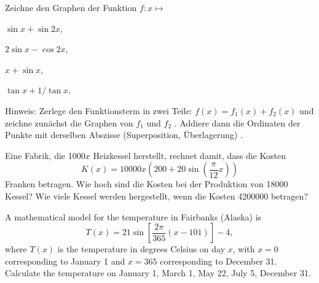 \documentclass[%
11pt,%
twoside,%
titlepage,%
german,%
headsepline%
]{scrartcl}
\begin{document}
\begin{ueb}[Superposition]
Zeichne den Graphen der Funktion $f:x\mapsto$

\begin{minipage}{0.49\textwidth}
\begin{enumeratea}
\item $\sin x + \sin2x$,
\item $2\sin x - \cos2x$,
\end{enumeratea}
\end{minipage}
\begin{minipage}{0.49\textwidth}
\begin{enumeratea}
\addtocounter{enumi}{2}
\item $x+\sin x$,
\item $\tan x +1/\tan x$.\\
\end{enumeratea}
\end{minipage}

\noindent Hinweis: Zerlege den Funktionsterm in zwei Teile: $f(x)=f_1(x)+f_2(x)$ und zeichne zunächst die Graphen von $f_1$ und $f_2$ . Addiere dann die Ordinaten der Punkte mit derselben Abszisse (Superposition, Überlagerung) .
\end{ueb}

\begin{ueb}
Eine Fabrik, die 1000$x$ Heizkessel herstellt, rechnet damit, dass die Kosten
$$K( x )= 10000x( 200 + 20\sin(\frac{\pi}{12}x))$$
Franken betragen. Wie hoch sind die Kosten bei der Produktion von 18000 Kessel? Wie viele Kessel werden hergestellt, wenn die Kosten 4200000 betragen?
\end{ueb}

\begin{ueb}[brrrrr]
A mathematical model for the temperature in Fairbanks (Alaska) is
$$T(x) = 21\sin\left[\frac{2\pi}{365}(x - 101)\right] - 4 ,$$
where $T(x)$ is the temperature in degrees Celsius on day $x$, with $x=0$ corresponding to January 1 and $x=365$ corresponding to December 31. Calculate the temperature on January 1, March 1, May 22, July 5, December 31.
\end{ueb}
\end{document}
